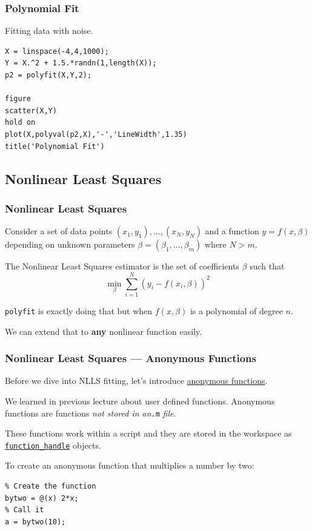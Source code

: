 \documentclass[11pt,xcolor={svgnames},aspectratio=169,usepdftitle=false]{beamer}
\let\toneitemize\itemize
\let\ttwoitemize\enditemize
\renewenvironment{itemize}{\toneitemize\addtolength{\itemsep}{0.7\baselineskip}}{\ttwoitemize}
\begin{document}
\begin{frame}[fragile]
  \frametitle{Polynomial Fit}
Fitting data with noise.
\begin{lstlisting}
X = linspace(-4,4,1000);
Y = X.^2 + 1.5.*randn(1,length(X));
p2 = polyfit(X,Y,2);

figure
scatter(X,Y)
hold on
plot(X,polyval(p2,X),'-','LineWidth',1.35)
title('Polynomial Fit')
\end{lstlisting}
\end{frame}

\subsection{Nonlinear Least Squares}

\begin{frame}[fragile]
  \frametitle{Nonlinear Least Squares}
\begin{itemize}
  \item Consider a set of data points $(x_1,y_1),\ldots,(x_N,y_N)$ and a function $y = f(x,\beta)$ depending on unknown parameters $\beta = (\beta_1,\ldots,\beta_m)$ where $N > m$.
  \item The Nonlinear Least Squares estimator is the set of coefficients $\beta$ such that
  \[
  \underset{\beta}{\min} \sum^N_{i=1} (y_i - f(x_i,\beta))^2
  \]
  \item \verb;polyfit; is exactly doing that but when $f(x,\beta)$ is a polynomial of degree $n$.
  \item We can extend that to \alert{\textbf{any}} nonlinear function easily.
\end{itemize}
\end{frame}

\begin{frame}[fragile]
  \frametitle{Nonlinear Least Squares --- Anonymous Functions}
  \begin{itemize}
    \item Before we dive into NLLS fitting, let's introduce \href{https://www.mathworks.com/help/matlab/matlab_prog/anonymous-functions.html}{anonymous functions}.
    \item We learned in previous lecture about user defined functions. Anonymous functions are functions \alert{\textit{not stored in an}\texttt{.m} \textit{file}}.
    \item These functions work within a script and they are stored in the workspace as \href{https://www.mathworks.com/help/matlab/ref/function_handle.html}{\texttt{function\_handle}} objects.
    \item To create an anonymous function that multiplies a number by two:
  \end{itemize}
\begin{lstlisting}
% Create the function
bytwo = @(x) 2*x;
% Call it
a = bytwo(10);
\end{lstlisting}
\end{frame}
\end{document}
